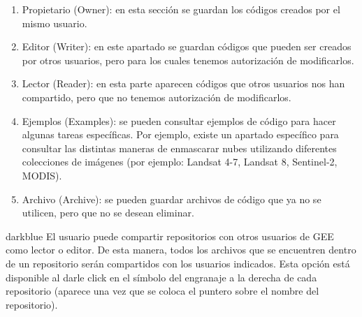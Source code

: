 \documentclass[
  12pt,
  letterpaper,
  twoside]{book}
\providecommand{\tightlist}{%
  \setlength{\itemsep}{0pt}\setlength{\parskip}{0pt}}
\begin{document}
\begin{enumerate}
\def\labelenumi{\arabic{enumi}.}
\tightlist
\item
  Propietario (Owner): en esta sección se guardan los códigos creados por el mismo usuario.
\item
  Editor (Writer): en este apartado se guardan códigos que pueden ser creados por otros usuarios, pero para los cuales tenemos autorización de modificarlos.
\item
  Lector (Reader): en esta parte aparecen códigos que otros usuarios nos han compartido, pero que no tenemos autorización de modificarlos.
\item
  Ejemplos (Examples): se pueden consultar ejemplos de código para hacer algunas tareas específicas. Por ejemplo, existe un apartado específico para consultar las distintas maneras de enmascarar nubes utilizando diferentes colecciones de imágenes (por ejemplo: Landsat 4-7, Landsat 8, Sentinel-2, MODIS).
\item
  Archivo (Archive): se pueden guardar archivos de código que ya no se utilicen, pero que no se desean eliminar.
\end{enumerate}

\begin{bluebox2}

\begin{awesomeblock}{5pt}{\faLightbulb}{darkblue}
El usuario puede compartir repositorios con otros usuarios de GEE como lector o editor. De esta manera, todos los archivos que se encuentren dentro de un repositorio serán compartidos con los usuarios indicados. Esta opción está disponible al darle click en el símbolo del engranaje a la derecha de cada repositorio (aparece una vez que se coloca el puntero sobre el nombre del repositorio).

\end{awesomeblock}

\end{bluebox2}
\end{document}
